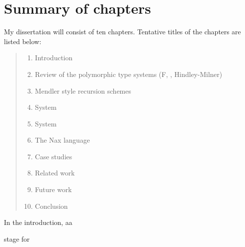 \section{Summary of chapters}\label{sec:summary}
My dissertation will consist of ten chapters.
Tentative titles of the chapters are listed below:
\begin{quote}
\begin{enumerate}[1.]
\item Introduction
\item Review of the polymorphic type systems (\textsf{F}, \Fw, Hindley-Milner)
\item Mendler style recursion schemes
\item System \Fi
\item System \Fixi
\item The Nax language
\item Case studies
\item Related work
\item Future work
\item Conclusion
\end{enumerate}
\end{quote}

In the introduction, aa

stage for
